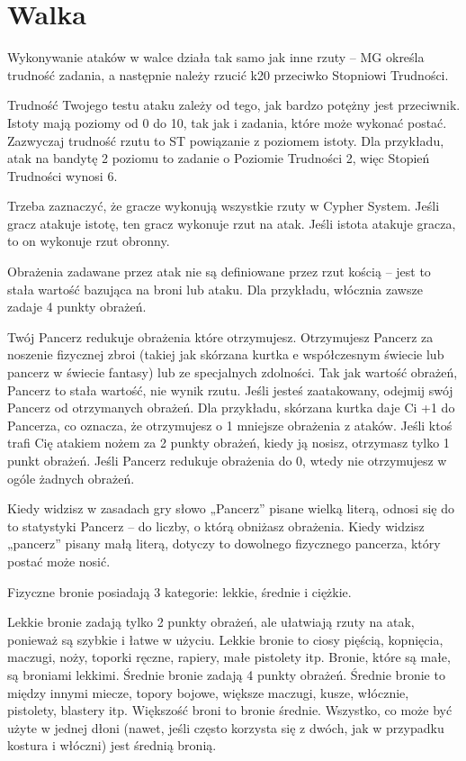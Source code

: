 \section {Walka}
Wykonywanie ataków w walce działa tak samo jak inne rzuty – MG określa trudność zadania, a następnie należy rzucić k20 przeciwko Stopniowi Trudności.

Trudność Twojego testu ataku zależy od tego, jak bardzo potężny jest przeciwnik. Istoty mają poziomy od 0 do 10, tak jak i zadania, które może wykonać postać. Zazwyczaj trudność rzutu to ST powiązanie z poziomem istoty. Dla przykładu, atak na bandytę 2 poziomu to zadanie o Poziomie Trudności 2, więc Stopień Trudności wynosi 6. 

Trzeba zaznaczyć, że gracze wykonują wszystkie rzuty w Cypher System. Jeśli gracz atakuje istotę, ten gracz wykonuje rzut na atak. Jeśli istota atakuje gracza, to on wykonuje rzut obronny. 

Obrażenia zadawane przez atak nie są definiowane przez rzut kością – jest to stała wartość bazująca na broni lub ataku. Dla przykładu, włócznia zawsze zadaje 4 punkty obrażeń.

Twój Pancerz redukuje obrażenia które otrzymujesz. Otrzymujesz Pancerz za noszenie fizycznej zbroi (takiej jak skórzana kurtka e współczesnym świecie lub pancerz w świecie fantasy) lub ze specjalnych zdolności. Tak jak wartość obrażeń, Pancerz to stała wartość, nie wynik rzutu. Jeśli jesteś zaatakowany, odejmij swój Pancerz od otrzymanych obrażeń. Dla przykładu, skórzana kurtka daje Ci +1 do Pancerza, co oznacza, że otrzymujesz o 1 mniejsze obrażenia z ataków. Jeśli ktoś trafi Cię atakiem nożem za 2 punkty obrażeń, kiedy ją nosisz, otrzymasz tylko 1 punkt obrażeń. Jeśli Pancerz redukuje obrażenia do 0, wtedy nie otrzymujesz w ogóle żadnych obrażeń. 

Kiedy widzisz w zasadach gry słowo „Pancerz” pisane wielką literą, odnosi się do to statystyki Pancerz – do liczby, o którą obniżasz obrażenia. Kiedy widzisz „pancerz” pisany małą literą, dotyczy to dowolnego fizycznego pancerza, który postać może nosić. 

Fizyczne bronie posiadają 3 kategorie: lekkie, średnie i ciężkie.  

Lekkie bronie zadają tylko 2 punkty obrażeń, ale ułatwiają rzuty na atak, ponieważ są szybkie i łatwe w użyciu. Lekkie bronie to ciosy pięścią, kopnięcia, maczugi, noży, toporki ręczne, rapiery, małe pistolety itp. Bronie, które są małe, są broniami lekkimi.
Średnie bronie zadają 4 punkty obrażeń. Średnie bronie to między innymi miecze, topory bojowe, większe maczugi, kusze, włócznie, pistolety, blastery itp. Większość broni to bronie średnie. Wszystko, co może być użyte w jednej dłoni (nawet, jeśli często korzysta się z dwóch, jak w przypadku kostura i włóczni) jest średnią bronią. 

